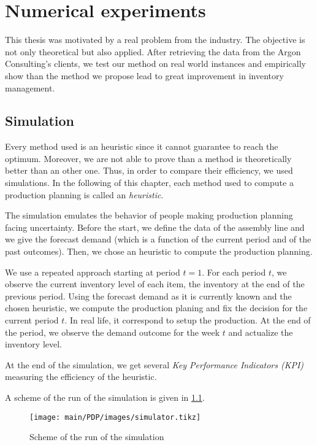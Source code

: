 \chapter{Numerical experiments}
\label{chap:PDP:numerical-experiments}

This thesis was motivated by a real problem from the industry. The objective is not only theoretical but also applied. After retrieving the data from the Argon Consulting's clients, we test our method on real world instances and empirically show than the method we propose lead to great improvement in inventory management.



\section{Simulation}

Every method used is an heuristic since it cannot guarantee to reach the optimum.
Moreover, we are not able to prove than a method is theoretically better than an other one.
Thus, in order to compare their efficiency, we used simulations.
In the following of this chapter, each method used to compute a production planning is called an \emph{heuristic}.


The simulation emulates the behavior of people making production planning facing uncertainty. Before the start, we define the data of the assembly line and we give the forecast demand (which is a function of the current period and of the past outcomes). Then, we chose an heuristic to compute the production planning.

We use a repeated approach starting at period $t=1$. For each period $t$, we observe the current inventory level of each item, \ie the inventory at the end of the previous period. Using the forecast demand as it is currently known and the chosen heuristic, we compute the production planing and fix the decision for the current period $t$. In real life, it correspond to setup the production. At the end of the period, we observe the demand outcome for the week $t$ and actualize the inventory level.

At the end of the simulation, we get several \emph{Key Performance Indicators (KPI)} measuring the efficiency of the heuristic.

A scheme of the run of the simulation is given in \cref{fig:simulator}.

\begin{figure}[h]
  \centering
  \texttt{[image: main/PDP/images/simulator.tikz]}
  \caption{Scheme of the run of the simulation}
  \label{fig:simulator}
\end{figure}


